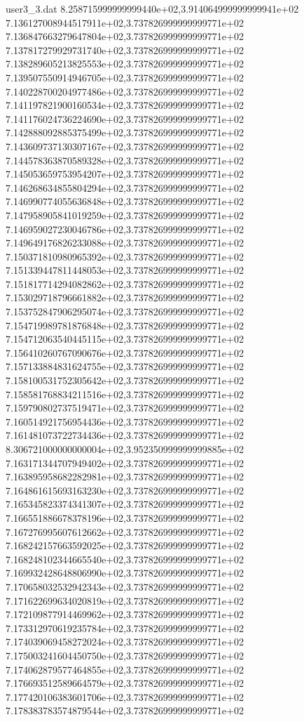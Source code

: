 \begin{filecontents}{user3_3.dat}
8.258715999999999440e+02,3.914064999999999941e+02
7.136127008944517911e+02,3.737826999999999771e+02
7.136847663279647804e+02,3.737826999999999771e+02
7.137817279929731740e+02,3.737826999999999771e+02
7.138289605213825553e+02,3.737826999999999771e+02
7.139507550914946705e+02,3.737826999999999771e+02
7.140228700204977486e+02,3.737826999999999771e+02
7.141197821900160534e+02,3.737826999999999771e+02
7.141176024736224690e+02,3.737826999999999771e+02
7.142888092885375499e+02,3.737826999999999771e+02
7.143609737130307167e+02,3.737826999999999771e+02
7.144578363870589328e+02,3.737826999999999771e+02
7.145053659753954207e+02,3.737826999999999771e+02
7.146268634855804294e+02,3.737826999999999771e+02
7.146990774055636848e+02,3.737826999999999771e+02
7.147958905841019259e+02,3.737826999999999771e+02
7.146959027230046786e+02,3.737826999999999771e+02
7.149649176826233088e+02,3.737826999999999771e+02
7.150371810980965392e+02,3.737826999999999771e+02
7.151339447811448053e+02,3.737826999999999771e+02
7.151817714294082862e+02,3.737826999999999771e+02
7.153029718796661882e+02,3.737826999999999771e+02
7.153752847906295074e+02,3.737826999999999771e+02
7.154719989781876848e+02,3.737826999999999771e+02
7.154712063540445115e+02,3.737826999999999771e+02
7.156410260767090676e+02,3.737826999999999771e+02
7.157133884831624755e+02,3.737826999999999771e+02
7.158100531752305642e+02,3.737826999999999771e+02
7.158581768834211516e+02,3.737826999999999771e+02
7.159790802737519471e+02,3.737826999999999771e+02
7.160514921756954436e+02,3.737826999999999771e+02
7.161481073722734436e+02,3.737826999999999771e+02
8.306721000000000004e+02,3.952350999999999885e+02
7.163171344707949402e+02,3.737826999999999771e+02
7.163895958682282981e+02,3.737826999999999771e+02
7.164861615693163230e+02,3.737826999999999771e+02
7.165345823374341307e+02,3.737826999999999771e+02
7.166551886678378196e+02,3.737826999999999771e+02
7.167276995607612662e+02,3.737826999999999771e+02
7.168242157663592025e+02,3.737826999999999771e+02
7.168248102344665540e+02,3.737826999999999771e+02
7.169932428648806990e+02,3.737826999999999771e+02
7.170658032532942343e+02,3.737826999999999771e+02
7.171622699634020819e+02,3.737826999999999771e+02
7.172109877914469962e+02,3.737826999999999771e+02
7.173312970619235784e+02,3.737826999999999771e+02
7.174039069458272024e+02,3.737826999999999771e+02
7.175003241604450750e+02,3.737826999999999771e+02
7.174062879577464855e+02,3.737826999999999771e+02
7.176693512589664579e+02,3.737826999999999771e+02
7.177420106383601706e+02,3.737826999999999771e+02
7.178383783574879544e+02,3.737826999999999771e+02

\end{filecontents}

